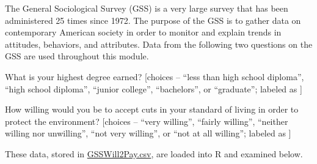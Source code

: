 \documentclass[10pt,openany]{book}\usepackage[]{graphicx}\usepackage[]{color}
\begin{document}
The General Sociological Survey (GSS) is a very large survey that has been administered 25 times since 1972. The purpose of the GSS is to gather data on contemporary American society in order to monitor and explain trends in attitudes, behaviors, and attributes. Data from the following two questions on the GSS are used throughout this module.

\begin{Itemize}
  \item What is your highest degree earned? [choices -- ``less than high school diploma'', ``high school diploma'', ``junior college'', ``bachelors'', or ``graduate''; labeled as ]
  \item How willing would you be to accept cuts in your standard of living in order to protect the environment? [choices -- ``very willing'', ``fairly willing'', ``neither willing nor unwilling'', ``not very willing'', or ``not at all willing''; labeled as ]
\end{Itemize}

These data, stored in \href{https://raw.githubusercontent.com/droglenc/NCData/master/GSSWill2Pay.csv}{GSSWill2Pay.csv}, are loaded into R and examined below.
\end{document}
